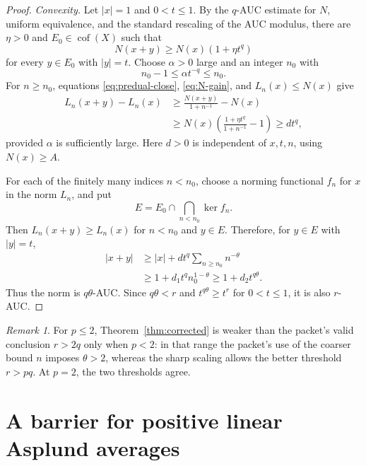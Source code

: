 \documentclass[11pt]{article}
\theoremstyle{definition}
\theoremstyle{remark}
\newtheorem{remark}[theorem]{Remark}
\newcommand{\cof}{\operatorname{cof}}
\newcommand{\absnorm}[1]{\left\lvert #1\right\rvert}
\begin{document}
\begin{proof}
\medskip
\noindent\emph{Convexity.}
Let \(\absnorm{x}=1\) and \(0<t\le1\).  By the \(q\)-AUC estimate for
\(N\), uniform equivalence, and the standard rescaling of the AUC modulus,
there are \(\eta>0\) and \(E_0\in\cof(X)\) such that
\begin{equation}\label{eq:N-gain}
 N(x+y)\ge N(x)(1+\eta t^q)
\end{equation}
for every \(y\in E_0\) with \(\absnorm{y}=t\).  Choose \(\alpha>0\) large
and an integer \(n_0\) with
\begin{equation}\label{eq:n0}
 n_0-1\le \alpha t^{-q}\le n_0.
\end{equation}
For \(n\ge n_0\), equations \eqref{eq:predual-close},
\eqref{eq:N-gain}, and \(L_n(x)\le N(x)\) give
\begin{align*}
 L_n(x+y)-L_n(x)
 &\ge \frac{N(x+y)}{1+n^{-1}}-N(x)\\
 &\ge N(x)\left(\frac{1+\eta t^q}{1+n^{-1}}-1\right)
 \ge d t^q,
\end{align*}
provided \(\alpha\) is sufficiently large.  Here \(d>0\) is independent of
\(x,t,n\), using \(N(x)\ge A\).

For each of the finitely many indices \(n<n_0\), choose a norming functional
\(f_n\) for \(x\) in the norm \(L_n\), and put
\[
 E=E_0\cap\bigcap_{n<n_0}\ker f_n.
\]
Then \(L_n(x+y)\ge L_n(x)\) for \(n<n_0\) and \(y\in E\).  Therefore,
for \(y\in E\) with \(\absnorm{y}=t\),
\begin{align*}
 \absnorm{x+y}
 &\ge \absnorm{x}+dt^q\sum_{n\ge n_0}n^{-\theta}\\
 &\ge 1+d_1t^q n_0^{1-\theta}
 \ge 1+d_2t^{q\theta}.
\end{align*}
Thus the norm is \(q\theta\)-AUC.  Since \(q\theta<r\) and
\(t^{q\theta}\ge t^r\) for \(0<t\le1\), it is also \(r\)-AUC.
\end{proof}

\begin{remark}
For \(p\le2\), Theorem~\ref{thm:corrected} is weaker than the packet's
valid conclusion \(r>2q\) only when \(p<2\): in that range the packet's use
of the coarser bound \(n\) imposes \(\theta>2\), whereas the sharp scaling
allows the better threshold \(r>pq\).  At \(p=2\), the two thresholds agree.
\end{remark}

\section{A barrier for positive linear Asplund averages}
\end{document}
